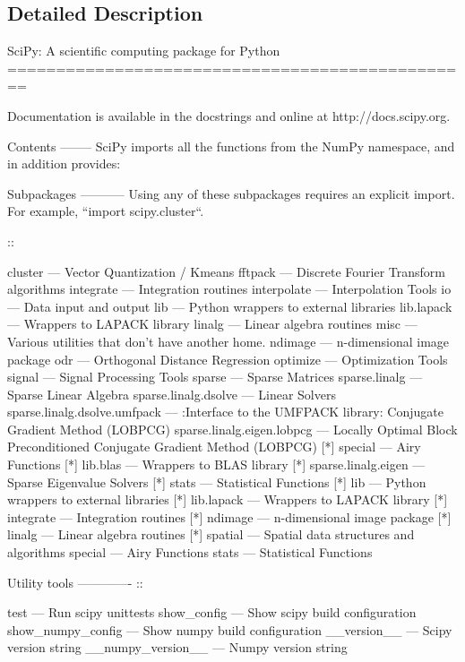 \subsection{Detailed Description}
\begin{DoxyVerb}SciPy: A scientific computing package for Python
================================================

Documentation is available in the docstrings and
online at http://docs.scipy.org.

Contents
--------
SciPy imports all the functions from the NumPy namespace, and in
addition provides:

Subpackages
-----------
Using any of these subpackages requires an explicit import.  For example,
``import scipy.cluster``.

::

 cluster                      --- Vector Quantization / Kmeans
 fftpack                      --- Discrete Fourier Transform algorithms
 integrate                    --- Integration routines
 interpolate                  --- Interpolation Tools
 io                           --- Data input and output
 lib                          --- Python wrappers to external libraries
 lib.lapack                   --- Wrappers to LAPACK library
 linalg                       --- Linear algebra routines
 misc                         --- Various utilities that don't have
                              another home.
 ndimage                      --- n-dimensional image package
 odr                          --- Orthogonal Distance Regression
 optimize                     --- Optimization Tools
 signal                       --- Signal Processing Tools
 sparse                       --- Sparse Matrices
 sparse.linalg                --- Sparse Linear Algebra
 sparse.linalg.dsolve         --- Linear Solvers
 sparse.linalg.dsolve.umfpack --- :Interface to the UMFPACK library:
                              Conjugate Gradient Method (LOBPCG)
 sparse.linalg.eigen.lobpcg   --- Locally Optimal Block Preconditioned
                              Conjugate Gradient Method (LOBPCG) [*]
 special                      --- Airy Functions [*]
 lib.blas                     --- Wrappers to BLAS library [*]
 sparse.linalg.eigen          --- Sparse Eigenvalue Solvers [*]
 stats                        --- Statistical Functions [*]
 lib                          --- Python wrappers to external libraries
                              [*]
 lib.lapack                   --- Wrappers to LAPACK library [*]
 integrate                    --- Integration routines [*]
 ndimage                      --- n-dimensional image package [*]
 linalg                       --- Linear algebra routines [*]
 spatial                      --- Spatial data structures and algorithms
 special                      --- Airy Functions
 stats                        --- Statistical Functions

Utility tools
-------------
::

 test              --- Run scipy unittests
 show_config       --- Show scipy build configuration
 show_numpy_config --- Show numpy build configuration
 __version__       --- Scipy version string
 __numpy_version__ --- Numpy version string\end{DoxyVerb}
 

